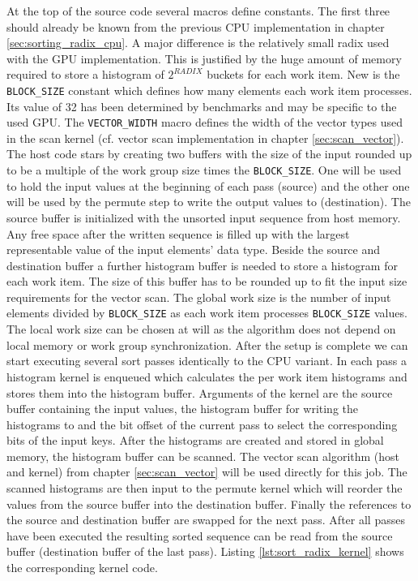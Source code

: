 

At the top of the source code several macros define constants. The first three should already be known from the previous CPU implementation in chapter \ref{sec:sorting_radix_cpu}. A major difference is the relatively small radix used with the GPU implementation. This is justified by the huge amount of memory required to store a histogram of $2^{RADIX}$ buckets for each work item. New is the \lstinline!BLOCK_SIZE! constant which defines how many elements each work item processes. Its value of 32 has been determined by benchmarks and may be specific to the used GPU. The \lstinline!VECTOR_WIDTH! macro defines the width of the vector types used in the scan kernel (cf. vector scan implementation in chapter \ref{sec:scan_vector}). 
The host code stars by creating two buffers with the size of the input rounded up to be a multiple of the work group size times the \lstinline!BLOCK_SIZE!. One will be used to hold the input values at the beginning of each pass (source) and the other one will be used by the permute step to write the output values to (destination). The source buffer is initialized with the unsorted input sequence from host memory. Any free space after the written sequence is filled up with the largest representable value of the input elements' data type.
Beside the source and destination buffer a further histogram buffer is needed to store a histogram for each work item. The size of this buffer has to be rounded up to fit the input size requirements for the vector scan. 
The global work size is the number of input elements divided by \lstinline!BLOCK_SIZE! as each work item processes \lstinline!BLOCK_SIZE! values. The local work size can be chosen at will as the algorithm does not depend on local memory or work group synchronization.
After the setup is complete we can start executing several sort passes identically to the CPU variant. In each pass a histogram kernel is enqueued which calculates the per work item histograms and stores them into the histogram buffer. Arguments of the kernel are the source buffer containing the input values, the histogram buffer for writing the histograms to and the bit offset of the current pass to select the corresponding bits of the input keys. After the histograms are created and stored in global memory, the histogram buffer can be scanned. The vector scan algorithm (host and kernel) from chapter \ref{sec:scan_vector} will be used directly for this job. The scanned histograms are then input to the permute kernel which will reorder the values from the source buffer into the destination buffer. Finally the references to the source and destination buffer are swapped for the next pass.
After all passes have been executed the resulting sorted sequence can be read from the source buffer (destination buffer of the last pass).
Listing \ref{lst:sort_radix_kernel} shows the corresponding kernel code.

